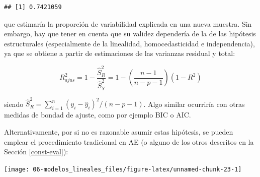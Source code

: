 \documentclass[
]{book}
\newenvironment{Shaded}{\begin{snugshade}}{\end{snugshade}}
\newcommand{\DataTypeTok}[1]{\textcolor[rgb]{0.13,0.29,0.53}{#1}}
\newcommand{\KeywordTok}[1]{\textcolor[rgb]{0.13,0.29,0.53}{\textbf{#1}}}
\newcommand{\NormalTok}[1]{#1}
\newcommand{\OperatorTok}[1]{\textcolor[rgb]{0.81,0.36,0.00}{\textbf{#1}}}
\newcommand{\StringTok}[1]{\textcolor[rgb]{0.31,0.60,0.02}{#1}}
\theoremstyle{break}
\theoremstyle{definition}
\theoremstyle{definition}
\theoremstyle{definition}
\theoremstyle{remark}
\begin{document}
\begin{verbatim}
## [1] 0.7421059
\end{verbatim}

que estimaría la proporción de variabilidad explicada en una nueva muestra.
Sin embargo, hay que tener en cuenta que su validez dependería de la de las hipótesis estructurales (especialmente de la linealidad, homocedasticidad e independencia), ya que se obtiene a partir de estimaciones de las varianzas residual y total:

\[R_{ajus}^{2} = 1 - \frac{\hat{S}_{R}^{2}}{\hat{S}_{Y}^{2}} 
= 1 - \left( \frac{n-1}{n-p-1} \right) (1-R^{2})\]

siendo \(\hat{S}_{R}^{2}=\sum_{i=1}^{n}(y_{i}-\hat{y}_{i})^{2}/(n - p - 1)\).
Algo similar ocurriría con otras medidas de bondad de ajuste, como por ejemplo BIC o AIC.

Alternativamente, por si no es razonable asumir estas hipótesis, se pueden emplear el procedimiento tradicional en AE (o alguno de los otros descritos en la Sección \ref{const-eval}):

\begin{Shaded}
\end{Shaded}

\begin{center}\texttt{[image: 06-modelos\_lineales\_files/figure-latex/unnamed-chunk-23-1]} \end{center}
\end{document}
